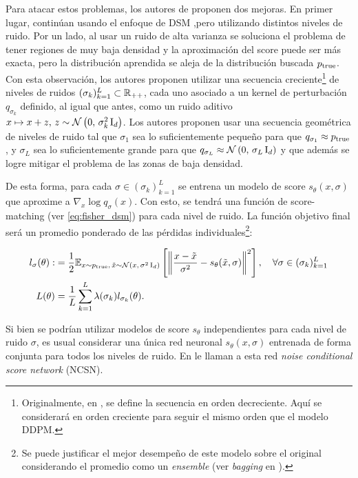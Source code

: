 Para atacar estos problemas, los autores de \cite{song2020generative} proponen dos mejoras. En primer lugar, continúan usando el enfoque de DSM ,pero utilizando distintos niveles de ruido. Por un lado, al usar un ruido de alta varianza se soluciona el problema de tener regiones de muy baja densidad y la aproximación del score puede ser más exacta, pero la distribución aprendida se aleja de la distribución buscada $p_{\operatorname{true}}$. Con esta observación, los autores proponen utilizar una secuencia creciente\footnote{Originalmente, en \cite{song2020generative}, se define la secuencia en orden decreciente. Aquí se considerará en orden creciente para seguir el mismo orden que el modelo DDPM.} de niveles de ruidos $(\sigma_k)_{k=1}^L\subset\mathbb{R}_{++}$, cada uno asociado a un kernel de perturbación $q_{\sigma_k}$ definido, al igual que antes, como un ruido aditivo $x\mapsto x+z,\,z\sim\mathcal{N}\left(0,\,\sigma_k^2 \operatorname{I}_{d}\right)$. Los autores proponen usar una secuencia geométrica de niveles de ruido tal que $\sigma_1$ sea lo suficientemente pequeño para que $q_{\sigma_1}\approx p_{\operatorname{true}}$, y $\sigma_L$ sea lo suficientemente grande para que $q_{\sigma_L}\approx\mathcal{N}\left(0,\,\sigma_L\operatorname{I}_{d}\right)$ y que además se logre mitigar el problema de las zonas de baja densidad.

De esta forma, para cada $\sigma\in(\sigma_k)_{k=1}^L$ se entrena un modelo de score $s_\theta(x,\sigma)$ que aproxime a $\nabla_x \log q_\sigma(x)$. Con esto, se tendrá una función de score-matching (ver \eqref{eq:fisher_dsm}) para cada nivel de ruido. La función objetivo final será un promedio ponderado de las pérdidas individuales\footnote{Se puede justificar el mejor desempeño de este modelo sobre el original considerando el promedio como un \textit{ensemble} (ver \textit{bagging} en \cite{bishop2006pattern}).}:

\begin{align}
    l_\sigma(\theta) : & = \frac{1}{2}\mathbb{E}_{x\sim p_{\operatorname{true}},\,\tilde{x}\sim \mathcal{N}\left(x,\,\sigma^2 \operatorname{I}_{d}\right)}\left[\left\lVert \frac{x-\tilde{x}}{\sigma^2} - s_\theta(\tilde{x}, \sigma) \right\rVert^2\right],\quad \forall\sigma\in (\sigma_k)_{k=1}^L\nonumber \\
    L(\theta)          & = \frac{1}{L} \sum_{k=1}^L \lambda(\sigma_k) l_{\sigma_k}(\theta)\label{eq:dsm_loss}.
\end{align}

Si bien se podrían utilizar modelos de score $s_\theta$ independientes para cada nivel de ruido $\sigma$, es usual considerar una única red neuronal $s_\theta(x,\sigma)$ entrenada de forma conjunta para todos los niveles de ruido. En \cite{song2020generative} le llaman a esta red \textit{noise conditional score network} (NCSN).

